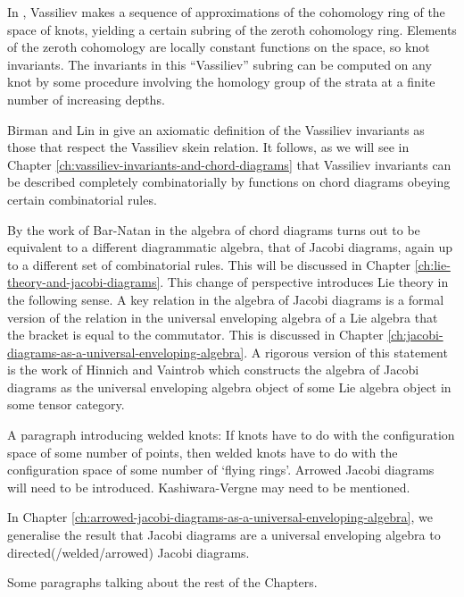 \begin{mdframed}
	In \cite{cohomology-of-knot-spaces}, Vassiliev makes a sequence of approximations of the cohomology ring of the space of knots, yielding a certain subring of the zeroth cohomology ring. Elements of the zeroth cohomology are locally constant functions on the space, so knot invariants. The invariants in this ``Vassiliev'' subring can be computed on any knot by some procedure involving the homology group of the strata at a finite number of increasing depths.

	Birman and Lin in \cite{knot-polynomials-and-vassilievs-invariants} give an axiomatic definition of the Vassiliev invariants as those that respect the Vassiliev skein relation. It follows, as we will see in Chapter \ref{ch:vassiliev-invariants-and-chord-diagrams} that Vassiliev invariants can be described completely combinatorially by functions on chord diagrams obeying certain combinatorial rules.

	By the work of Bar-Natan in \cite{on-the-vassiliev-knot-invariants} the algebra of chord diagrams turns out to be equivalent to a different diagrammatic algebra, that of Jacobi diagrams, again up to a different set of combinatorial rules. This will be discussed in Chapter \ref{ch:lie-theory-and-jacobi-diagrams}. This change of perspective introduces Lie theory in the following sense. A key relation in the algebra of Jacobi diagrams is a formal version of the relation in the universal enveloping algebra of a Lie algebra that the bracket is equal to the commutator. This is discussed in Chapter \ref{ch:jacobi-diagrams-as-a-universal-enveloping-algebra}. A rigorous version of this statement is the work of Hinnich and Vaintrob \cite{cyclic-operads-and-the-algebra-of-chord-diagrams} which constructs the algebra of Jacobi diagrams as the universal enveloping algebra object of some Lie algebra object in some tensor category.

	A paragraph introducing welded knots: If knots have to do with the configuration space of some number of points, then welded knots have to do with the configuration space of some number of `flying rings'. Arrowed Jacobi diagrams will need to be introduced. Kashiwara-Vergne may need to be mentioned.

	In Chapter \ref{ch:arrowed-jacobi-diagrams-as-a-universal-enveloping-algebra}, we generalise the result that Jacobi diagrams are a universal enveloping algebra to directed(/welded/arrowed) Jacobi diagrams.

	Some paragraphs talking about the rest of the Chapters.
\end{mdframed}
